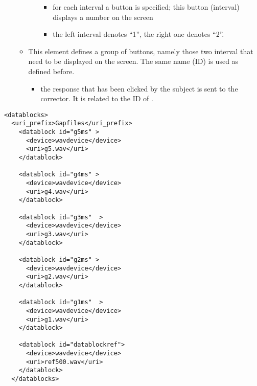 \begin{itemize}
\begin{itemize}
\begin{itemize}
\begin{itemize}
\item {} for each interval a button is specified;
this button (interval) displays a number on the screen

\item {} the left interval denotes ``1'', the right
one denotes ``2''.

\end{itemize}
\end{itemize}

\item {} This element defines a group of
buttons, namely those two interval that need to be displayed on
the screen. The same name (ID) is used as defined before.

\begin{itemize}
\item {} the response that has been
clicked by the subject is sent to the corrector. It is related to
the ID of .

\end{itemize}
\end{itemize}
\end{itemize}












\begin{lstlisting}
<datablocks>
  <uri_prefix>Gapfiles</uri_prefix>
    <datablock id="g5ms" >
      <device>wavdevice</device>
      <uri>g5.wav</uri>
    </datablock>

    <datablock id="g4ms" >
      <device>wavdevice</device>
      <uri>g4.wav</uri>
    </datablock>

    <datablock id="g3ms"  >
      <device>wavdevice</device>
      <uri>g3.wav</uri>
    </datablock>

    <datablock id="g2ms" >
      <device>wavdevice</device>
      <uri>g2.wav</uri>
    </datablock>

    <datablock id="g1ms"  >
      <device>wavdevice</device>
      <uri>g1.wav</uri>
    </datablock>

    <datablock id="datablockref">
      <device>wavdevice</device>
      <uri>ref500.wav</uri>
    </datablock>
  </datablocks>
\end{lstlisting}



